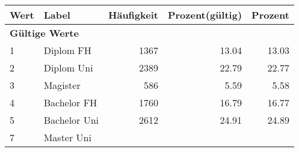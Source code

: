      \begin{longtable}{lXrrr}
     \toprule
     \textbf{Wert} & \textbf{Label} & \textbf{Häufigkeit} & \textbf{Prozent(gültig)} & \textbf{Prozent} \\
     \endhead
     \midrule
     \multicolumn{5}{l}{\textbf{Gültige Werte}}\\

     1 &
     \multicolumn{1}{X}{ Diplom FH   } &


       \num{1367} &
       \num[round-mode=places,round-precision=2]{13,04} &
         \num[round-mode=places,round-precision=2]{13,03} \\

     2 &
     \multicolumn{1}{X}{ Diplom Uni   } &


       \num{2389} &
       \num[round-mode=places,round-precision=2]{22,79} &
         \num[round-mode=places,round-precision=2]{22,77} \\

     3 &
     \multicolumn{1}{X}{ Magister   } &


       \num{586} &
       \num[round-mode=places,round-precision=2]{5,59} &
         \num[round-mode=places,round-precision=2]{5,58} \\

     4 &
     \multicolumn{1}{X}{ Bachelor FH   } &


       \num{1760} &
       \num[round-mode=places,round-precision=2]{16,79} &
         \num[round-mode=places,round-precision=2]{16,77} \\

     5 &
     \multicolumn{1}{X}{ Bachelor Uni   } &


       \num{2612} &
       \num[round-mode=places,round-precision=2]{24,91} &
         \num[round-mode=places,round-precision=2]{24,89} \\

     7 &
     \multicolumn{1}{X}{ Master Uni   } &



\end{longtable}
